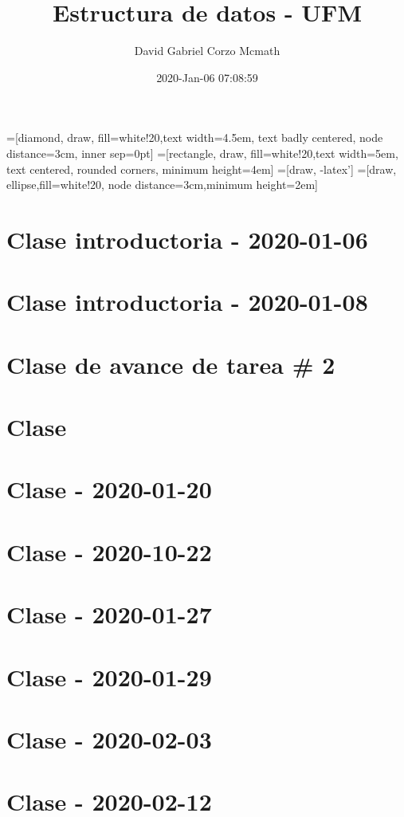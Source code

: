 \documentclass{book}
\title{Estructura de datos - UFM}
\author{David Gabriel Corzo Mcmath}
\date{2020-Jan-06 07:08:59}
\begin{document}
\maketitle
\tableofcontents

=[diamond, draw, fill=white!20,text width=4.5em, text badly centered, node distance=3cm, inner sep=0pt]
=[rectangle, draw, fill=white!20,text width=5em, text centered, rounded corners, minimum height=4em]
=[draw, -latex']
=[draw, ellipse,fill=white!20, node distance=3cm,minimum height=2em]


\chapter{Clase introductoria - 2020-01-06}


\chapter{Clase introductoria - 2020-01-08}


\chapter{Clase de avance de tarea \# 2}


\chapter{Clase }


\chapter{Clase - 2020-01-20}


\chapter{Clase - 2020-10-22}



\chapter{Clase - 2020-01-27}


\chapter{Clase - 2020-01-29}


\chapter{Clase - 2020-02-03}


\chapter{Clase - 2020-02-12}


\end{document}
